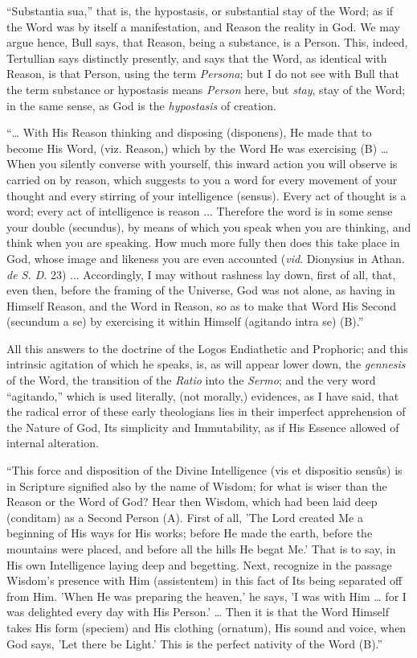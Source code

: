 ``Substantia sua,'' that is, the hypostasis, or substantial
stay of the Word; as if the Word was by itself a manifestation, and
Reason the reality in God. We may argue hence, Bull says, that Reason,
being a substance, is a Person. This, indeed, Tertullian says
distinctly presently, and says that the Word, as identical with
Reason, is that Person, using the term \emph{Persona}; but I do not
see with Bull that the term substance or hypostasis means \emph{Person}
here, but \emph{stay}, stay of the Word; in the same sense, as God is
the \emph{hypostasis} of creation.

``… With His Reason thinking and disposing (disponens), He
made that to become His Word, (viz. Reason,) which by the Word He was
exercising (B) … When you silently converse with yourself, this
inward action you will observe is carried on by reason, which suggests
to you a word for every movement of your thought and every stirring of
your intelligence (sensus). Every act of thought is a word; every act
of intelligence is reason ... Therefore the word is in some sense your
double (secundus), by means of which you speak when you are thinking,
and think when you are speaking. How much more fully then does this
take place in God, whose image and likeness you are even
accounted (\emph{vid}. Dionysius in Athan. \emph{de S. D}. 23) ...
Accordingly, I may without rashness lay down, first of all, that, even
then, before the framing of the Universe, God was not alone, as having
in Himself Reason, and the Word in Reason, so as to make that Word His
Second (secundum a se) by exercising it within Himself (agitando intra
se) (B).''

All this answers to the doctrine of the Logos Endiathetic and
Prophoric; and this intrinsic agitation of which he speaks, is, as
will appear lower down, the \emph{gennesis} of the Word, the
transition of the \emph{Ratio} into the \emph{Sermo}; and the very
word ``agitando,'' which is used literally, (not morally,)
evidences, as I have said, that the radical error of these early
theologians lies in their imperfect apprehension of the Nature of God,
Its simplicity and Immutability, as if His Essence allowed of internal
alteration.

``This force and disposition of the Divine Intelligence (vis et
dispositio sensûs) is in Scripture signified also by the name of
Wisdom; for what is wiser than the Reason or the Word of God? Hear
then Wisdom, which had been laid deep (conditam) as a Second Person
(A). First of all, 'The Lord created Me a beginning of His ways for
His works; before He made the earth, before the mountains were placed,
and before all the hills He begat Me.' That is to say, in His own
Intelligence laying deep and begetting. Next, recognize in the passage
Wisdom's presence with Him (assistentem) in this fact of Its being
separated off from Him. 'When He was preparing the heaven,' he says,
'I was with Him … for I was delighted every day with His
Person.' … Then it is that the Word Himself takes His form (speciem)
and His clothing (ornatum), His sound and voice, when God says, 'Let
there be Light.' This is the perfect nativity of the Word (B).''

